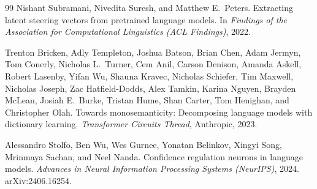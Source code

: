 \documentclass[11pt,letterpaper]{article}
\begin{document}
\begin{thebibliography}{99}
Nishant Subramani, Nivedita Suresh, and Matthew E.\ Peters.
\newblock Extracting latent steering vectors from pretrained language models.
\newblock In \emph{Findings of the Association for Computational Linguistics (ACL Findings)}, 2022.

Trenton Bricken, Adly Templeton, Joshua Batson, Brian Chen, Adam Jermyn, Tom Conerly, Nicholas L.\ Turner, Cem Anil, Carson Denison, Amanda Askell, Robert Lasenby, Yifan Wu, Shauna Kravec, Nicholas Schiefer, Tim Maxwell, Nicholas Joseph, Zac Hatfield-Dodds, Alex Tamkin, Karina Nguyen, Brayden McLean, Josiah E.\ Burke, Tristan Hume, Shan Carter, Tom Henighan, and Christopher Olah.
\newblock Towards monosemanticity: Decomposing language models with dictionary learning.
\newblock \emph{Transformer Circuits Thread}, Anthropic, 2023.

Alessandro Stolfo, Ben Wu, Wes Gurnee, Yonatan Belinkov, Xingyi Song, Mrinmaya Sachan, and Neel Nanda.
\newblock Confidence regulation neurons in language models.
\newblock \emph{Advances in Neural Information Processing Systems (NeurIPS)}, 2024.
\newblock arXiv:2406.16254.

\end{thebibliography}
\end{document}
